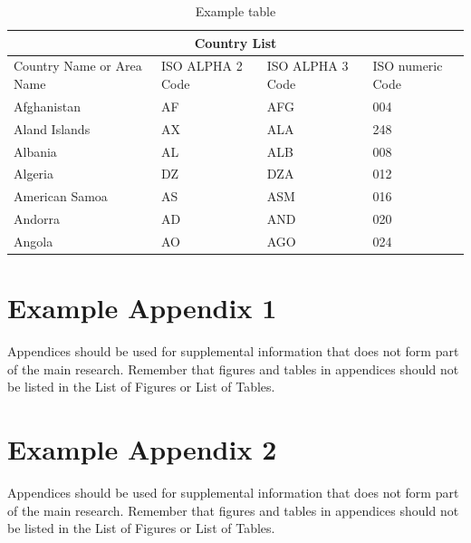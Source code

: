 \documentclass{imc-inf}
\begin{document}
\begin{table}[ht]
\begin{tabular}{ |p{3cm}||p{3cm}|p{3cm}|p{3cm}|  }
	\hline
	\multicolumn{4}{|c|}{Country List} \\
	\hline
	Country Name     or Area Name& ISO ALPHA 2 Code &ISO ALPHA 3 Code&ISO numeric Code\\
	\hline
	Afghanistan   & AF    &AFG&   004\\
	Aland Islands&   AX  & ALA   &248\\
	Albania &AL & ALB&  008\\
	Algeria    &DZ & DZA&  012\\
	American Samoa&   AS  & ASM&016\\
	Andorra& AD  & AND   &020\\
	Angola& AO  & AGO&024\\
	\hline
\end{tabular}
\caption{\label{tab:table-name}Example table}
\end{table}




%
%
%
%
%

\backmatter%
	
	
	

\begin{appendices} %
\chapter{Example Appendix 1}

Appendices should be used for supplemental information that does not form part of the main research. Remember that figures and tables in appendices should not be listed in the List of Figures or List of Tables. 

\chapter{Example Appendix 2}

Appendices should be used for supplemental information that does not form part of the main research. Remember that figures and tables in appendices should not be listed in the List of Figures or List of Tables. 
	
\end{appendices}
\end{document}
